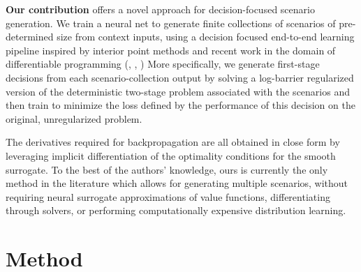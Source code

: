 \documentclass{article}
\begin{document}
\textbf{Our contribution} offers a novel approach for decision-focused scenario generation. 
We train a neural net to generate finite collections of scenarios of pre-determined size from context inputs, using a decision focused end-to-end learning pipeline
inspired by interior point methods and recent work in the domain of differentiable programming (\cite{amosOptNetDifferentiableOptimization2017}, \cite{mengDifferentiableOptimizationGeneralized2021}, \cite{tanLearningLinearPrograms2020}) 
More specifically, we generate first-stage decisions from each scenario-collection output by solving a log-barrier regularized version of the deterministic two-stage problem associated with the scenarios 
and then train to minimize the loss defined by the performance of this decision on the original, unregularized problem.

The derivatives required for backpropagation are all obtained in close form by leveraging implicit differentiation of the optimality conditions for the smooth surrogate.
To the best of the authors' knowledge, ours is currently the only method in the literature which allows for generating multiple scenarios, without requiring neural surrogate approximations of value functions, differentiating through solvers, 
or performing computationally expensive distribution learning.



\section{Method}
\end{document}
